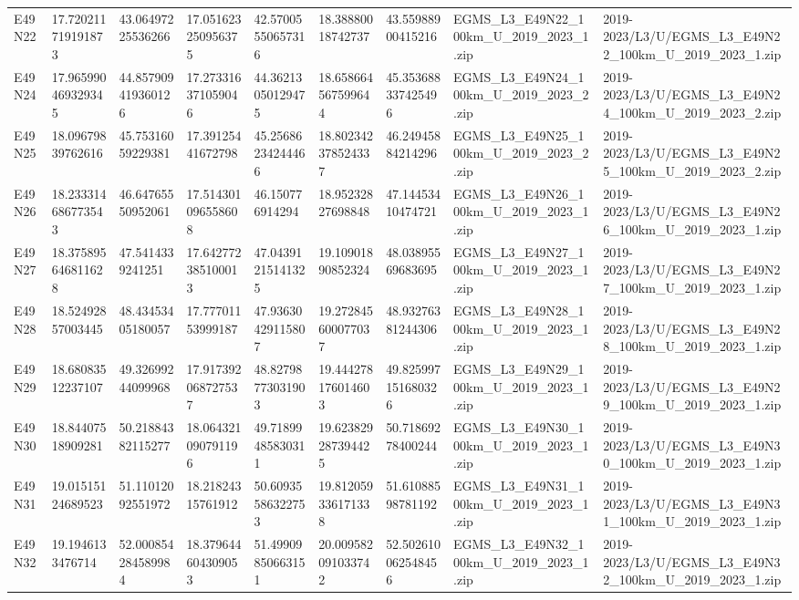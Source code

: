 \begin{landscape}
\begin{longtable}{lllllllll}
E49N22 & 17.720211719191873 & 43.06497225536266 & 17.051623250956375 & 42.57005550657316 & 18.38880018742737 & 43.55988900415216 & EGMS\_L3\_E49N22\_100km\_U\_2019\_2023\_1.zip & 2019-2023/L3/U/EGMS\_L3\_E49N22\_100km\_U\_2019\_2023\_1.zip \\
E49N24 & 17.965990469329345 & 44.857909419360126 & 17.273316371059046 & 44.36213050129475 & 18.658664567599644 & 45.353688337425496 & EGMS\_L3\_E49N24\_100km\_U\_2019\_2023\_2.zip & 2019-2023/L3/U/EGMS\_L3\_E49N24\_100km\_U\_2019\_2023\_2.zip \\
E49N25 & 18.09679839762616 & 45.75316059229381 & 17.39125441672798 & 45.25686234244466 & 18.802342378524337 & 46.24945884214296 & EGMS\_L3\_E49N25\_100km\_U\_2019\_2023\_2.zip & 2019-2023/L3/U/EGMS\_L3\_E49N25\_100km\_U\_2019\_2023\_2.zip \\
E49N26 & 18.233314686773543 & 46.64765550952061 & 17.514301096558608 & 46.150776914294 & 18.95232827698848 & 47.14453410474721 & EGMS\_L3\_E49N26\_100km\_U\_2019\_2023\_1.zip & 2019-2023/L3/U/EGMS\_L3\_E49N26\_100km\_U\_2019\_2023\_1.zip \\
E49N27 & 18.375895646811628 & 47.5414339241251 & 17.642772385100013 & 47.04391215141325 & 19.10901890852324 & 48.03895569683695 & EGMS\_L3\_E49N27\_100km\_U\_2019\_2023\_1.zip & 2019-2023/L3/U/EGMS\_L3\_E49N27\_100km\_U\_2019\_2023\_1.zip \\
E49N28 & 18.52492857003445 & 48.43453405180057 & 17.77701153999187 & 47.93630429115807 & 19.272845600077037 & 48.93276381244306 & EGMS\_L3\_E49N28\_100km\_U\_2019\_2023\_1.zip & 2019-2023/L3/U/EGMS\_L3\_E49N28\_100km\_U\_2019\_2023\_1.zip \\
E49N29 & 18.68083512237107 & 49.32699244099968 & 17.917392068727537 & 48.82798773031903 & 19.444278176014603 & 49.825997151680326 & EGMS\_L3\_E49N29\_100km\_U\_2019\_2023\_1.zip & 2019-2023/L3/U/EGMS\_L3\_E49N29\_100km\_U\_2019\_2023\_1.zip \\
E49N30 & 18.84407518909281 & 50.21884382115277 & 18.064321090791196 & 49.71899485830311 & 19.623829287394425 & 50.71869278400244 & EGMS\_L3\_E49N30\_100km\_U\_2019\_2023\_1.zip & 2019-2023/L3/U/EGMS\_L3\_E49N30\_100km\_U\_2019\_2023\_1.zip \\
E49N31 & 19.01515124689523 & 51.11012092551972 & 18.21824315761912 & 50.60935586322753 & 19.812059336171338 & 51.61088598781192 & EGMS\_L3\_E49N31\_100km\_U\_2019\_2023\_1.zip & 2019-2023/L3/U/EGMS\_L3\_E49N31\_100km\_U\_2019\_2023\_1.zip \\
E49N32 & 19.1946133476714 & 52.000854284589984 & 18.379644604309053 & 51.49909850663151 & 20.009582091033742 & 52.502610062548456 & EGMS\_L3\_E49N32\_100km\_U\_2019\_2023\_1.zip & 2019-2023/L3/U/EGMS\_L3\_E49N32\_100km\_U\_2019\_2023\_1.zip \\

\end{longtable}
\end{landscape}
